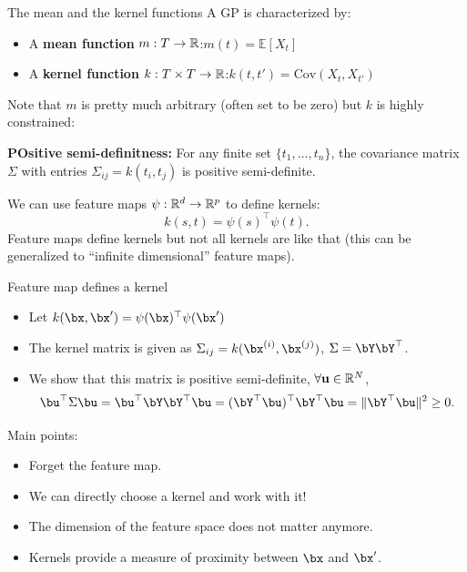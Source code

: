 \documentclass[11pt,handout,aspectratio=169]{beamer}
\begin{document}
\begin{frame}{The mean and the kernel functions}
	A GP is characterized  by:
    \begin{itemize}
        \item A \textbf{mean function} $m:T\to \mathbb R$:\quad  \( m(t) = \mathbb{E}[X_t] \)
        \item A \textbf{kernel function} $k:T\times T\to \mathbb R$:\quad  \( k(t, t') = \text{Cov}(X_t, X_{t'}) \)
    \end{itemize}
 \begin{exampleblock}{}
 	Note that $m$ is pretty much arbitrary (often set to be zero) but $k$ is highly constrained:
 	
 	\textbf{POsitive semi-definitness:} For any finite set \( \{t_1, \dots, t_n\} \), the covariance matrix \( \Sigma \) with entries \( \Sigma_{ij} = k(t_i, t_j) \) is positive semi-definite.
 \end{exampleblock} 
 We can use feature maps $\psi:\mathbb R^d\to \mathbb R^p$ to define kernels: 
  $$k(s,t) = \psi(s)^\top\psi(t).$$ 
Feature maps define kernels but not all kernels are like that (this can be generalized to ``infinite dimensional'' feature maps).
\end{frame}


\begin{frame}{Feature map defines a kernel}
\begin{itemize}
\item Let $k(\bx,\bx') =  \psi(\bx)^\top \psi(\bx') $
  \item The kernel matrix is given as $\Sigma_{ij} = k(\bx^{(i)},\bx^{(j)})$, $\Sigma=\bY\bY^\top$.
  \item
  We show that this matrix is positive semi-definite, $\forall \mathbf u \in \mathbb R^N$, 
  $$
    \bu^\top \Sigma \bu = \bu^\top \bY\bY^\top\bu=(\bY^\top \bu)^\top \bY^\top \bu=\|\bY^\top \bu\|^2\geq0.
  $$	
\end{itemize}
Main points:

\begin{itemize}
\item Forget the feature map.
	\item We can directly choose a kernel and work with it!
	\item The dimension of the feature space does not matter anymore.
  \item Kernels provide a measure of proximity between $\bx$ and $\bx'$.
\end{itemize}
\end{frame}
\end{document}
